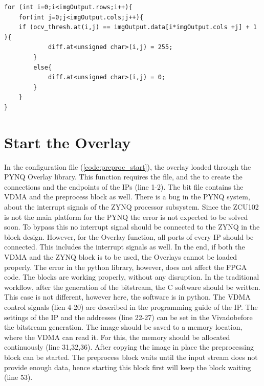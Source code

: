 \begin{lstlisting}
for (int i=0;i<imgOutput.rows;i++){
	for(int j=0;j<imgOutput.cols;j++){
	if (ocv_thresh.at(i,j) == imgOutput.data[i*imgOutput.cols +j] + 1 ){
			diff.at<unsigned char>(i,j) = 255;
		}
		else{
			diff.at<unsigned char>(i,j) = 0;
		}
	}
}
\end{lstlisting}

\clearpage

\section{Start the Overlay} %
In the configuration file (\cref{code:preproc_start}), the overlay loaded through the PYNQ Overlay library.
This function requires the  file, and the  to create the connections and the endpoints of the IPs (line 1-2).
The bit file contains the VDMA and the preprocess block as well.
There is a bug in the PYNQ system, about the interrupt signals of the ZYNQ processor subsystem.
Since the ZCU102 is not the main platform for the PYNQ the error is not expected to be solved soon.
To bypass this no interrupt signal should be connected to the ZYNQ in the block design.
However, for the Overlay function, all ports of every IP should be connected.
This includes the interrupt signals as well.
In the end, if both the VDMA and the ZYNQ block is to be used, the Overlays cannot be loaded properly.
The error in the python library, however, does not affect the FPGA code.
The blocks are working properly, without any disruption.
In the traditional workflow, after the generation of the bitstream, the C software should be written.
This case is not different, however here, the software is in python.
The VDMA control signals (lien 4-20) are described in the programming guide of the IP.
The settings of the IP and the addresses (line 22-27) can be set in the Vivado\texttrademark before the bitstream generation.
The image should be saved to a memory location, where the VDMA can read it.
For this, the memory should be allocated continuously (line 31,32,36).
After copying the image in place the preprocessing block can be started.
The preprocess block waits until the input stream does not provide enough data, hence starting this block first will keep the block waiting (line 53).
